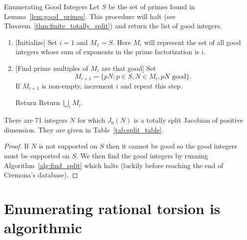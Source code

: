 \documentclass[11pt, proquest]{uwthesis}
\begin{document}
\begin{algorithm}{Enumerating Good Integers}
    \label{alg:find_split}
    Let $S$ be the set of primes found in Lemma~\ref{lem:good_primes}. This
    procedure will halt (see Theorem~\ref{thm:finite_totally_split}) and return
    the list of good integers.
\end{algorithm}
\begin{enumerate}
    \item{} [Initialize] 
        Set $i=1$ and $M_1=S$. Here $M_i$ will represent the set of all good
        integers whose sum of exponents in the prime factorization is $i$.
    \item{} [Find prime multiples of $M_i$ are that good]
        Set
        \[
            M_{i+1}=\{pN: p\in S, N\in M_i, pN \text{ good}\}.
        \]
        If $M_{i+1}$ is non-empty, increment $i$ and repeat this step.
    \item [Return] 
        Return $\bigcup_i M_i$.
\end{enumerate}

\begin{theorem}
    \label{thm:finite_totally_split}
    There are 71 integers $N$ for which $J_0(N)$ is a totally split Jacobian of
    positive dimension. They are given in Table~\ref{tab:split_table}.
\end{theorem}
\begin{proof}
    If $N$ is not supported on $S$ then it cannot be good so the good integers
    must be supported on $S$. We then find the good integers by running
    Algorithm~\ref{alg:find_split} which halts (luckily before reaching the end
    of Cremona's database).
\end{proof}


\section{Enumerating rational torsion is algorithmic}
\end{document}
